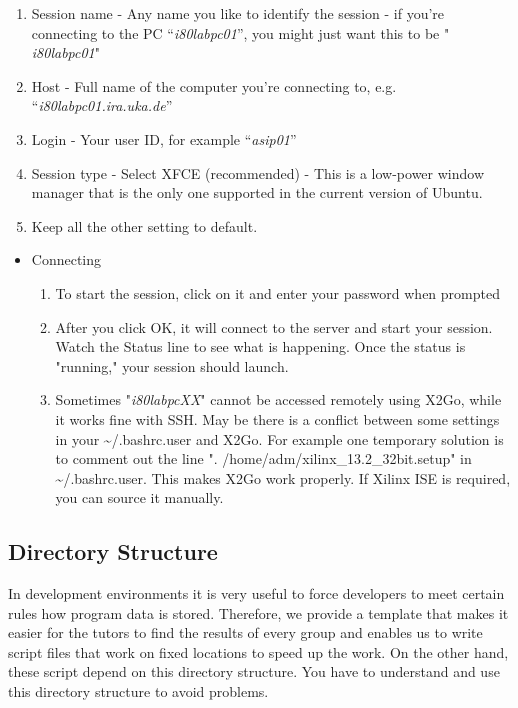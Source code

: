 \documentclass[
]{article}
\begin{document}
\begin{enumerate}
\def\labelenumi{\alph{enumi}.}
\item
  Session name - Any name you like to identify the session - if you're
  connecting to the PC ``\emph{i80labpc01}'', you might just want this
  to be " \emph{i80labpc01}"
\item
  Host - Full name of the computer you're connecting to, e.g.
  ``\emph{i80labpc01.ira.uka.de}''
\item
  Login - Your user ID, for example ``\emph{asip01}''
\item
  Session type - Select XFCE (recommended) - This is a low-power window
  manager that is the only one supported in the current version of
  Ubuntu.
\item
  Keep all the other setting to default.
\end{enumerate}

\begin{itemize}
\item
  Connecting

  \begin{enumerate}
  \def\labelenumi{\alph{enumi}.}
  \item
    To start the session, click on it and enter your password when
    prompted
  \item
    After you click OK, it will connect to the server and start your
    session. Watch the Status line to see what is happening. Once the
    status is "running," your session should launch.
  \item
    Sometimes "\emph{i80labpcXX}" cannot be accessed remotely using
    X2Go, while it works fine with SSH. May be there is a conflict
    between some settings in your \textasciitilde/.bashrc.user and X2Go.
    For example one temporary solution is to comment out the line ".
    /home/adm/xilinx\_13.2\_32bit.setup" in
    \textasciitilde/.bashrc.user. This makes X2Go work properly. If
    Xilinx ISE is required, you can source it manually.
  \end{enumerate}
\end{itemize}

\hypertarget{directory-structure}{%
\subsection{Directory Structure}\label{directory-structure}}

In development environments it is very useful to force developers to
meet certain rules how program data is stored. Therefore, we provide a
template that makes it easier for the tutors to find the results of
every group and enables us to write script files that work on fixed
locations to speed up the work. On the other hand, these script depend
on this directory structure. You have to understand and use this
directory structure to avoid problems.
\end{document}
